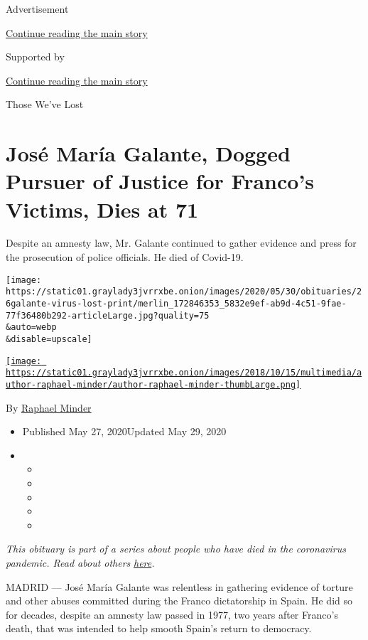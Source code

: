 Advertisement

\protect\hyperlink{after-top}{Continue reading the main story}

Supported by

\protect\hyperlink{after-sponsor}{Continue reading the main story}

Those We've Lost

\hypertarget{josuxe9-maruxeda-galante-dogged-pursuer-of-justice-for-francos-victims-dies-at-71}{%
\section{José María Galante, Dogged Pursuer of Justice for Franco's
Victims, Dies at
71}\label{josuxe9-maruxeda-galante-dogged-pursuer-of-justice-for-francos-victims-dies-at-71}}

Despite an amnesty law, Mr. Galante continued to gather evidence and
press for the prosecution of police officials. He died of Covid-19.

\texttt{[image: https://static01.graylady3jvrrxbe.onion/images/2020/05/30/obituaries/26galante-virus-lost-print/merlin\_172846353\_5832e9ef-ab9d-4c51-9fae-77f36480b292-articleLarge.jpg?quality=75\\\&auto=webp\\\&disable=upscale]}

\href{https://www.nytimes3xbfgragh.onion/by/raphael-minder}{\texttt{[image: https://static01.graylady3jvrrxbe.onion/images/2018/10/15/multimedia/author-raphael-minder/author-raphael-minder-thumbLarge.png]}}

By \href{https://www.nytimes3xbfgragh.onion/by/raphael-minder}{Raphael
Minder}

\begin{itemize}
\item
  Published May 27, 2020Updated May 29, 2020
\item
  \begin{itemize}
  \item
  \item
  \item
  \item
  \item
  \end{itemize}
\end{itemize}

\emph{This obituary is part of a series about people who have died in
the coronavirus pandemic. Read about others}
\href{https://www.nytimes3xbfgragh.onion/interactive/2020/obituaries/people-died-coronavirus-obituaries.html}{\emph{here}}\emph{.}

MADRID --- José María Galante was relentless in gathering evidence of
torture and other abuses committed during the Franco dictatorship in
Spain. He did so for decades, despite an amnesty law passed in 1977, two
years after Franco's death, that was intended to help smooth Spain's
return to democracy.

